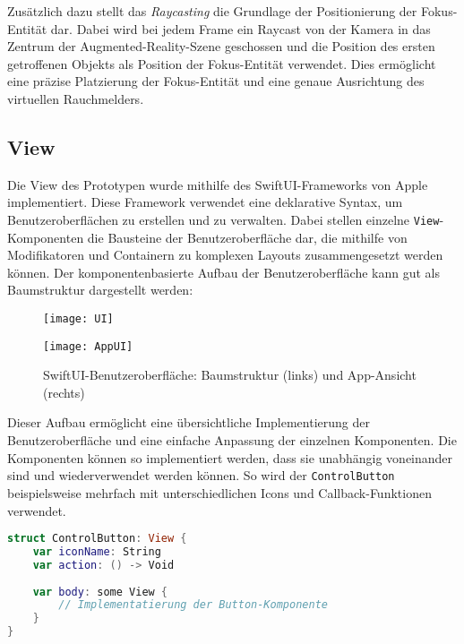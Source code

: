 Zusätzlich dazu stellt das \textit{Raycasting} die Grundlage der Positionierung der Fokus-Entität dar. Dabei wird bei jedem Frame ein Raycast von der Kamera in das Zentrum der Augmented-Reality-Szene geschossen und die Position des ersten getroffenen Objekts als Position der Fokus-Entität verwendet. Dies ermöglicht eine präzise Platzierung der Fokus-Entität und eine genaue Ausrichtung des virtuellen Rauchmelders.

\subsection{View}

Die View des Prototypen wurde mithilfe des SwiftUI-Frameworks von Apple implementiert. Diese Framework verwendet eine deklarative Syntax, um Benutzeroberflächen zu erstellen und zu verwalten. Dabei stellen einzelne \texttt{View}-Komponenten die Bausteine der Benutzeroberfläche dar, die mithilfe von Modifikatoren und Containern zu komplexen Layouts zusammengesetzt werden können. Der komponentenbasierte Aufbau der Benutzeroberfläche kann gut als Baumstruktur dargestellt werden:

\begin{figure}[h]
    \centering
    \begin{minipage}{0.45\textwidth}
        \centering
        \texttt{[image: UI]}
        \label{fig:UITree}
    \end{minipage}
    \hfill
    \begin{minipage}{0.45\textwidth}
        \centering
        \texttt{[image: AppUI]}
        \label{fig:UIApp}
    \end{minipage}
    \caption{SwiftUI-Benutzeroberfläche: Baumstruktur (links) und App-Ansicht (rechts)}
\end{figure}

Dieser Aufbau ermöglicht eine übersichtliche Implementierung der Benutzeroberfläche und eine einfache Anpassung der einzelnen Komponenten. Die Komponenten können so implementiert werden, dass sie unabhängig voneinander sind und wiederverwendet werden können. So wird der \texttt{ControlButton} beispielsweise mehrfach mit unterschiedlichen Icons und Callback-Funktionen verwendet.

\begin{lstlisting}[language=Swift]
struct ControlButton: View {
    var iconName: String
    var action: () -> Void
        
    var body: some View {
        // Implementatierung der Button-Komponente
    }
}
\end{lstlisting}

